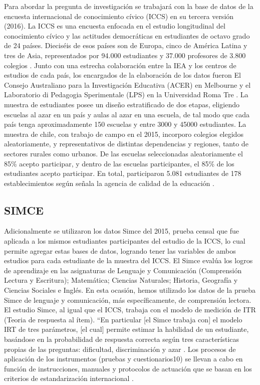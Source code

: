 \documentclass[12pt,twoside]{templates/facsothesis}
\begin{document}
Para abordar la pregunta de investigación se trabajará con la base de datos de la encuesta internacional de conocimiento cívico (ICCS) en su tercera versión (2016). La ICCS es una encuesta enfocada en el estudio longitudinal del conocimiento cívico y las actitudes democráticas en estudiantes de octavo grado de 24 países. Dieciséis de esos países son de Europa, cinco de América Latina y tres de Asia, representados por 94.000 estudiantes y 37.000 profesores de 3.800 colegios \citep{schulz_ICCS_2016}. Junto con una estrecha colaboración entre la IEA y los centros de estudios de cada país, los encargados de la elaboración de los datos fueron El Consejo Australiano para la Investigación Educativa (ACER) en Melbourne y el Laboratorio di Pedagogia Sperimentale (LPS) en la Universidad Roma Tre \citep{iea_International_2016}. La muestra de estudiantes posee un diseño estratificado de dos etapas, eligiendo escuelas al azar en un país y aulas al azar en una escuela, de tal modo que cada país tenga aproximadamente 150 escuelas y entre 3000 y 45000 estudiantes. La muestra de chile, con trabajo de campo en el 2015, incorporo colegios elegidos aleatoriamente, y representativos de distintas dependencias y regiones, tanto de sectores rurales como urbanos. De las escuelas seleccionadas aleatoriamente el 85\% acepto participar, y dentro de las escuelas participantes, el 85\% de los estudiantes acepto participar. En total, participaron 5.081 estudiantes de 178 establecimientos según señala la agencia de calidad de la educación \citep{ace_Informe_2018a}.

\hypertarget{simce}{%
\subsection{SIMCE}\label{simce}}

Adicionalmente se utilizaron los datos Simce del 2015, prueba censal que fue aplicada a los mismos estudiantes participantes del estudio de la ICCS, lo cual permite agregar estas bases de datos, logrando tener las variables de ambos estudios para cada estudiante de la muestra del ICCS. El Simce evalúa los logros de aprendizaje en las asignaturas de Lenguaje y Comunicación (Comprensión Lectura y Escritura); Matemática; Ciencias Naturales; Historia, Geografía y Ciencias Sociales e Inglés. En esta ocasión, hemos utilizado los datos de la prueba Simce de lenguaje y comunicación, más específicamente, de comprensión lectora. El estudio Simce, al igual que el ICCS, trabaja con el modelo de medición de ITR (Teoria de respuesta al ítem). ``En particular {[}el Simce trabaja con{]} el modelo IRT de tres parámetros, {[}el cual{]} permite estimar la habilidad de un estudiante, basándose en la probabilidad de respuesta correcta según tres características propias de las preguntas: dificultad, discriminación y azar \citep{ace_Informe_2018}. Los procesos de aplicación de los instrumentos (pruebas y cuestionarios10) se llevan a cabo en función de instrucciones, manuales y protocolos de actuación que se basan en los criterios de estandarización internacional \citep{aera_Report_2011}.
\end{document}
